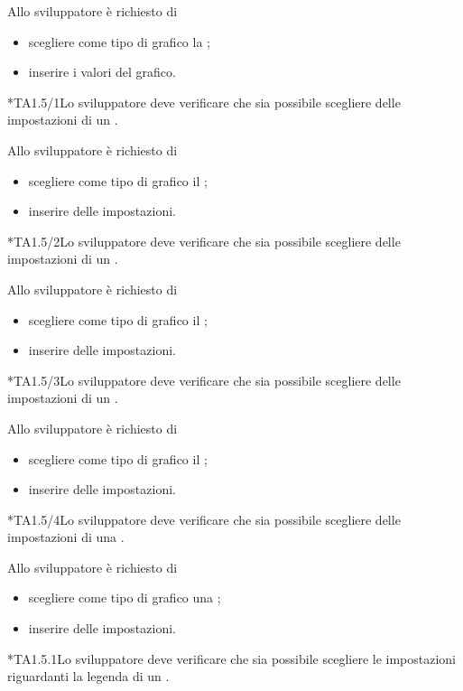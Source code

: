 		Allo sviluppatore è richiesto di
		\begin{itemize}
			\item scegliere come tipo di grafico la ;
			\item inserire i valori del grafico.
		\end{itemize}

	*{TA1.5/1}Lo sviluppatore deve verificare che sia possibile scegliere delle impostazioni di un .

		Allo sviluppatore è richiesto di
		\begin{itemize}
			\item scegliere come tipo di grafico il ;
			\item inserire delle impostazioni.
		\end{itemize}

	*{TA1.5/2}Lo sviluppatore deve verificare che sia possibile scegliere delle impostazioni di un .

		Allo sviluppatore è richiesto di
		\begin{itemize}
			\item scegliere come tipo di grafico il ;
			\item inserire delle impostazioni.
		\end{itemize}

	*{TA1.5/3}Lo sviluppatore deve verificare che sia possibile scegliere delle impostazioni di un .

		Allo sviluppatore è richiesto di
		\begin{itemize}
			\item scegliere come tipo di grafico il ;
			\item inserire delle impostazioni.
		\end{itemize}

	*{TA1.5/4}Lo sviluppatore deve verificare che sia possibile scegliere delle impostazioni di una .

		Allo sviluppatore è richiesto di
		\begin{itemize}
			\item scegliere come tipo di grafico una ;
			\item inserire delle impostazioni.
		\end{itemize}

	*{TA1.5.1}Lo sviluppatore deve verificare che sia possibile scegliere le impostazioni riguardanti la legenda di un .

